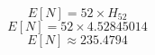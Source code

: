 \documentclass[10pt]{article}
\begin{document}
$$E[N] = 52 \times H_{52}$$$$E[N] = 52 \times 4.52845014$$$$E[N] \approx 235.4794$$
\end{document}
